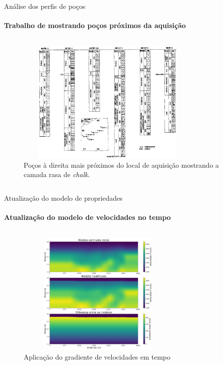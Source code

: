 \documentclass[xcolor=dvipsnames,t]{beamer}
\begin{document}
\begin{frame}{Análise dos perfis de poços}
\framesubtitle{Trabalho de  mostrando poços próximos da aquisição}	
	
\begin{columns}[onlytextwidth, T]
	\begin{column}{.9\textwidth}
		\begin{figure}[h]
			\includegraphics[width=9cm,height=6cm]{../imagens/pocos.png}	
			\tiny{\caption{Poços à direita mais próximos do local de aquisição mostrando a camada rasa de \textit{chalk}.}}
		\end{figure}			
	\end{column}
\end{columns}	
	
\end{frame}
\begin{frame}{Atualização do modelo de propriedades}
\framesubtitle{Atualização do modelo de velocidades no tempo}	
	
\begin{columns}[onlytextwidth, T]
	\begin{column}{.9\textwidth}
		\begin{figure}[h]
			\includegraphics[width=8cm,height=6cm]{../imagens/modificationTime.png}	
			\tiny{\caption{Aplicação do gradiente de velocidades em tempo}}
		\end{figure}			
	\end{column}
\end{columns}		
	
\end{frame}
\end{document}
